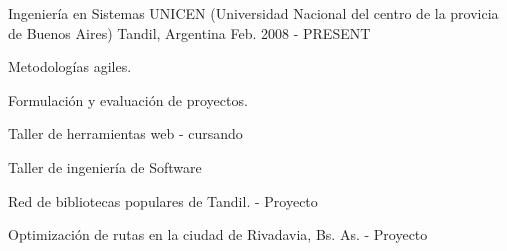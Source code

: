 


\begin{cventries}


\cventry
{Ingeniería en Sistemas} %
{UNICEN (Universidad Nacional del centro de la provicia de Buenos Aires)} %
{Tandil, Argentina} %
{Feb. 2008 - PRESENT} %
{ %
\begin{cvitems}
\item {Metodologías agiles.}
\item {Formulación y evaluación de proyectos.}
\item {Taller de herramientas web - cursando}
\item {Taller de ingeniería de Software}
\item {Red de bibliotecas populares de Tandil. - Proyecto}
\item {Optimización de rutas en la ciudad de Rivadavia, Bs. As. - Proyecto}
\end{cvitems}
}


\end{cventries}
